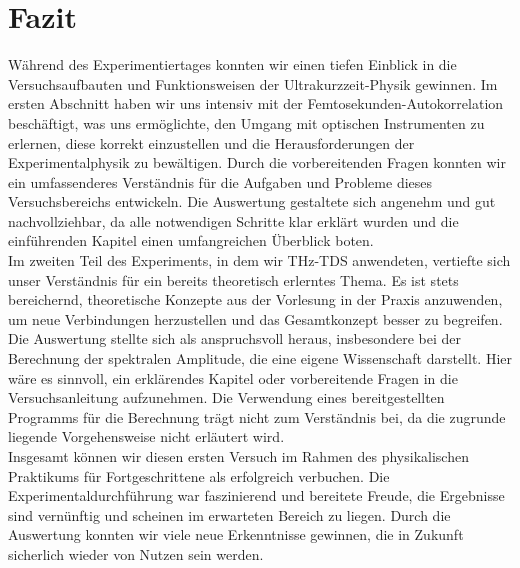 \section{\label{sec:fazit}Fazit}
Während des Experimentiertages konnten wir einen tiefen Einblick in die Versuchsaufbauten und Funktionsweisen 
der Ultrakurzzeit-Physik gewinnen. Im ersten Abschnitt haben wir uns intensiv mit der Femtosekunden-Autokorrelation 
beschäftigt, was uns ermöglichte, den Umgang mit optischen Instrumenten zu erlernen, diese korrekt einzustellen und 
die Herausforderungen der Experimentalphysik zu bewältigen. Durch die vorbereitenden Fragen konnten wir ein umfassenderes 
Verständnis für die Aufgaben und Probleme dieses Versuchsbereichs entwickeln. Die Auswertung gestaltete sich angenehm 
und gut nachvollziehbar, da alle notwendigen Schritte klar erklärt wurden und die einführenden Kapitel einen umfangreichen 
Überblick boten. \\
Im zweiten Teil des Experiments, in dem wir THz-TDS anwendeten, vertiefte sich unser Verständnis für ein bereits theoretisch 
erlerntes Thema. Es ist stets bereichernd, theoretische Konzepte aus der Vorlesung in der Praxis anzuwenden, um neue 
Verbindungen herzustellen und das Gesamtkonzept besser zu begreifen. Die Auswertung stellte sich als anspruchsvoll heraus, 
insbesondere bei der Berechnung der spektralen Amplitude, die eine eigene Wissenschaft darstellt. Hier wäre es sinnvoll, 
ein erklärendes Kapitel oder vorbereitende Fragen in die Versuchsanleitung aufzunehmen. Die Verwendung eines bereitgestellten 
Programms für die Berechnung trägt nicht zum Verständnis bei, da die zugrunde liegende Vorgehensweise nicht erläutert wird. \\
Insgesamt können wir diesen ersten Versuch im Rahmen des physikalischen Praktikums für Fortgeschrittene als erfolgreich verbuchen. 
Die Experimentaldurchführung war faszinierend und bereitete Freude, die Ergebnisse sind vernünftig und scheinen im erwarteten 
Bereich zu liegen. Durch die Auswertung konnten wir viele neue Erkenntnisse gewinnen, die in Zukunft sicherlich wieder von Nutzen 
sein werden.